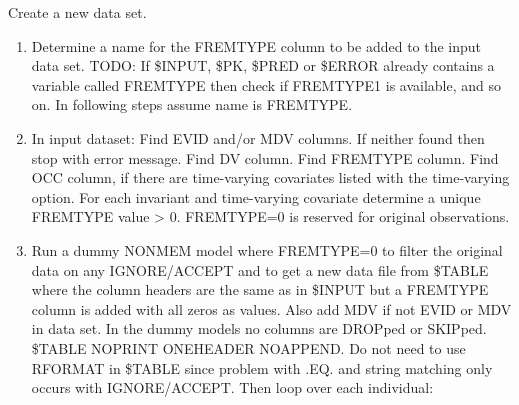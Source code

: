Create a new data set.
\begin{enumerate} 
	\item Determine a name for the FREMTYPE column to be added to the input data set. TODO: If \$INPUT, \$PK, \$PRED or \$ERROR already contains a variable called FREMTYPE then check if FREMTYPE1 is available, and so on. In following steps assume name is FREMTYPE.
	\item In input dataset: Find EVID and/or MDV columns. If neither found then stop with error message. Find DV column. Find FREMTYPE column. Find OCC column, if there are time-varying covariates listed with the time-varying option. For each invariant and time-varying covariate  determine a unique FREMTYPE value > 0. FREMTYPE=0 is reserved for original observations.
	\item Run a dummy NONMEM model where FREMTYPE=0 to filter the original data on any IGNORE/ACCEPT and to get a new data file from \$TABLE where the column headers are the same as in \$INPUT but a FREMTYPE column is added with all zeros as values. Also add MDV if not EVID or MDV in data set. In the dummy models no columns are DROPped or SKIPped. \$TABLE NOPRINT ONEHEADER NOAPPEND.  Do not need to use RFORMAT in \$TABLE since problem with .EQ. and string matching only occurs with IGNORE/ACCEPT.
Then loop over each individual: 


\end{enumerate}
